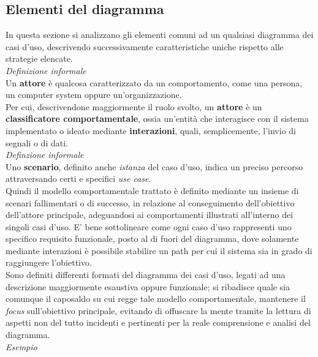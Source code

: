 \documentclass{article}
\begin{document}
\subsection*{Elementi del diagramma}
In questa sezione si analizzano gli elementi comuni ad un qualsiasi diagramma dei casi d'uso, descrivendo successivamente caratteristiche uniche rispetto alle strategie elencate.\vspace*{14pt}\\
\textit{Definizione informale}\\
Un \textbf{attore} è qualcosa caratterizzato da un comportamento, come una persona, un computer system oppure un'organizzazione.\vspace*{14pt}\\
Per cui, descrivendone maggiormente il ruolo svolto, un \textbf{attore} è un \textbf{classificatore comportamentale}, ossia un'entità che interagisce con il sistema implementato o ideato mediante \textbf{interazioni}, quali, semplicemente, l'invio di segnali o di dati.\vspace*{14pt}\\
\textit{Definzione informale}\\
Uno \textbf{scenario}, definito anche \textit{istanza} del caso d'uso, indica un preciso percorso attraversando certi e specifici \textit{use case}.\vspace*{14pt}\\
Quindi il modello comportamentale trattato è definito mediante un insieme di scenari fallimentari o di successo, in relazione al conseguimento dell'obiettivo dell'attore principale, adeguandosi ai comportamenti illustrati all'interno dei singoli casi d'uso. E' bene sottolineare come ogni caso d'uso rappresenti uno specifico requisito funzionale, posto al di fuori del diagramma, dove solamente mediante interazioni è possibile stabilire un path per cui il sistema sia in grado di raggiungere l'obiettivo.\\
Sono definiti differenti formati del diagramma dei casi d'uso, legati ad una descrizione maggiormente esaustiva oppure funzionale; si ribadisce quale sia comunque il caposaldo su cui regge tale modello comportamentale, mantenere il \textit{focus} sull'obiettivo principale, evitando di offuscare la mente tramite la lettura di aspetti non del tutto incidenti e pertinenti per la reale comprensione e analisi del diagramma.\vspace*{14pt}\\
\textit{Esempio}\vspace*{2pt}\\
\end{document}
